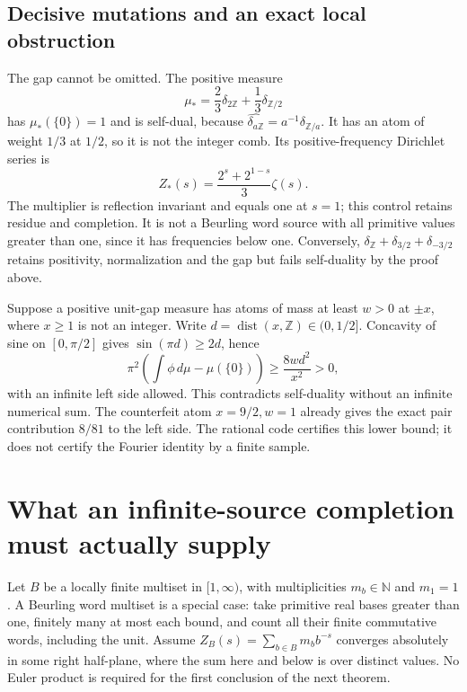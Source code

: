 \documentclass[11pt]{article}
\theoremstyle{remark}\newtheorem{remark}[theorem]{Remark}
\newcommand{\Z}{\mathbb Z}\newcommand{\N}{\mathbb N}
\newcommand{\dd}{\,d}\newcommand{\comb}[1]{\delta_{#1}}
\begin{document}
\subsection{Decisive mutations and an exact local obstruction}
The gap cannot be omitted. The positive measure
\[
 \mu_* =\frac23\comb{2\Z}+\frac13\comb{\Z/2}
\]
has $\mu_*(\{0\})=1$ and is self-dual, because
$\widehat{\comb{a\Z}}=a^{-1}\comb{\Z/a}$. It has an atom of weight
$1/3$ at $1/2$, so it is not the integer comb. Its positive-frequency
Dirichlet series is
\[
 Z_*(s)=\frac{2^s+2^{1-s}}3\zeta(s).
\]
The multiplier is reflection invariant and equals one at $s=1$; this
control retains residue and completion. It is not a Beurling word source
with all primitive values greater than one, since it has frequencies below
one. Conversely, $\comb{\Z}+\delta_{3/2}+\delta_{-3/2}$ retains positivity,
normalization and the gap but fails self-duality by the proof above.

Suppose a positive unit-gap measure has atoms of mass at least $w>0$ at
$\pm x$, where $x\geq1$ is not an integer. Write
$d=\operatorname{dist}(x,\Z)\in(0,1/2]$. Concavity of sine on
$[0,\pi/2]$ gives $\sin(\pi d)\geq2d$, hence
\begin{equation}\label{eq:obstruction}
 \pi^2\left(\int\phi\dd\mu-\mu(\{0\})\right)
 \geq \frac{8wd^2}{x^2}>0,
\end{equation}
with an infinite left side allowed. This contradicts self-duality without
an infinite numerical sum. The counterfeit atom $x=9/2,w=1$ already gives
the exact pair contribution $8/81$ to the left side. The rational code
certifies this lower bound; it does not certify the Fourier identity by a
finite sample.

\section{What an infinite-source completion must actually supply}
Let $B$ be a locally finite multiset in $[1,\infty)$, with multiplicities
$m_b\in\N$ and $m_1=1$. A Beurling word multiset is a special case: take
primitive real bases greater than one, finitely many at most each bound,
and count all their finite commutative words, including the unit. Assume
$Z_B(s)=\sum_{b\in B}m_b b^{-s}$ converges absolutely in some right
half-plane, where the sum here and below is over distinct values.
No Euler product is required for the first conclusion of the next theorem.
\end{document}
